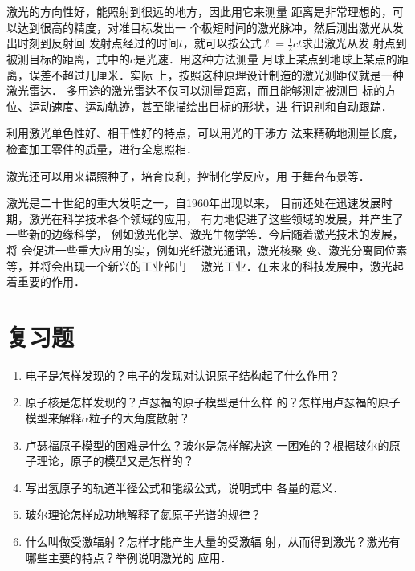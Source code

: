 激光的方向性好，能照射到很远的地方，因此用它来测量
距离是非常理想的，可以达到很高的精度，对准目标发出一
个极短时间的激光脉冲，然后测出激光从发出时刻到反射回
发射点经过的时间$t$，就可以按公式$\ell=\frac{1}{2}ct$求出激光从发
射点到被测目标的距离，式中的$c$是光速．用这种方法测量
月球上某点到地球上某点的距离，误差不超过几厘米．实际
上，按照这种原理设计制造的激光测距仪就是一种激光雷达．
多用途的激光雷达不仅可以测量距离，而且能够测定被测目
标的方位、运动速度、运动轨迹，甚至能描绘出目标的形状，进
行识别和自动跟踪．

利用激光单色性好、相干性好的特点，可以用光的干涉方
法来精确地测量长度，检查加工零件的质量，进行全息照相．

激光还可以用来辐照种子，培育良利，控制化学反应，用
于舞台布景等．

激光是二十世纪的重大发明之一，自1960年出现以来，
目前还处在迅速发展时期，激光在科学技术各个领域的应用，
有力地促进了这些领域的发展，并产生了一些新的边缘科学，
例如激光化学、激光生物学等．今后随着激光技术的发展，将
会促进一些重大应用的实，例如光纤激光通讯，激光核聚
变、激光分离同位素等，并将会出现一个新兴的工业部门－
激光工业．在未来的科技发展中，激光起着重要的作用．

\section*{复习题}

\begin{enumerate}
    \item 电子是怎样发现的？电子的发现对认识原子结构起了什么作用？
    \item 原子核是怎样发现的？卢瑟福的原子模型是什么样
的？怎样用卢瑟福的原子模型来解释$\alpha$粒子的大角度散射？
\item 卢瑟福原子模型的困难是什么？玻尔是怎样解决这
一困难的？根据玻尔的原子理论，原子的模型又是怎样的？
\item 写出氢原子的轨道半径公式和能级公式，说明式中
各量的意义．
\item 玻尔理论怎样成功地解释了氮原子光谱的规律？
\item 什么叫做受激辐射？怎样才能产生大量的受激辐
射，从而得到激光？激光有哪些主要的特点？举例说明激光的
应用．
\end{enumerate}



